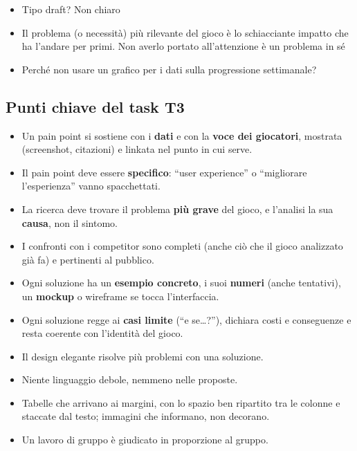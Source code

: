 {\begin{itemize}
  \item {} Tipo draft? Non chiaro
  \item {} Il problema (o necessità) più rilevante del gioco è lo schiacciante impatto che ha l'andare per primi. Non averlo portato all'attenzione è un problema in sé
  \item {} Perché non usare un grafico per i dati sulla progressione settimanale?
\end{itemize}
}

\subsection{Punti chiave del task T3}
\label{rv:t3:sec:punti-chiave}

\begin{itemize}
  \item Un pain point si sostiene con i \textbf{dati} e con la \textbf{voce
        dei giocatori}, mostrata (screenshot, citazioni) e linkata nel punto
        in cui serve.
  \item Il pain point deve essere \textbf{specifico}: ``user experience'' o
        ``migliorare l'esperienza'' vanno spacchettati.
  \item La ricerca deve trovare il problema \textbf{più grave} del gioco, e
        l'analisi la sua \textbf{causa}, non il sintomo.
  \item I confronti con i competitor sono completi (anche ciò che il gioco
        analizzato già fa) e pertinenti al pubblico.
  \item Ogni soluzione ha un \textbf{esempio concreto}, i suoi
        \textbf{numeri} (anche tentativi), un \textbf{mockup} o wireframe se
        tocca l'interfaccia.
  \item Ogni soluzione regge ai \textbf{casi limite} (``e se\dots?''),
        dichiara costi e conseguenze e resta coerente con l'identità del
        gioco.
  \item Il design elegante risolve più problemi con una soluzione.
  \item Niente linguaggio debole, nemmeno nelle proposte.
  \item Tabelle che arrivano ai margini, con lo spazio ben ripartito tra le
        colonne e staccate dal testo; immagini che informano, non decorano.
  \item Un lavoro di gruppo è giudicato in proporzione al gruppo.
\end{itemize}


